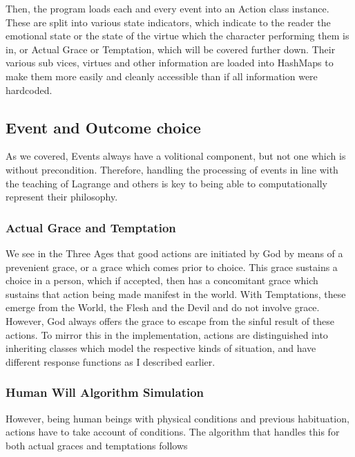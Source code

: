 \documentclass[11pt]{article}
\begin{document}
Then, the program loads each and every event into an Action class instance. These are split into various state indicators, which indicate to the reader the emotional state or the state of the virtue which the character performing them is in, or Actual Grace or Temptation, which will be covered further down. Their various sub vices, virtues and other information are loaded into HashMaps to make them more easily and cleanly accessible than if all information were hardcoded. 

\subsection{Event and Outcome choice}
As we covered, Events always have a volitional component, but not one which is without precondition. Therefore, handling the processing of events in line with the teaching of Lagrange and others is key to being able to computationally represent their philosophy. \\
\subsubsection{Actual Grace and Temptation}
We see in the Three Ages \cite{garrigou2013three} that good actions are initiated by God by means of a prevenient grace, or a grace which comes prior to choice. This grace sustains a choice in a person, which if accepted, then has a concomitant grace which sustains that action being made manifest in the world. With Temptations, these emerge from the World, the Flesh and the Devil and do not involve grace. However, God always offers the grace to escape from the sinful result of these actions. To mirror this in the implementation, actions are distinguished into inheriting classes which model the respective kinds of situation, and have different response functions as I described earlier. \\

\subsubsection{Human Will Algorithm Simulation}
However, being human beings with physical conditions and previous habituation, actions have to take account of conditions. The algorithm that handles this for both actual graces and temptations follows\:
\end{document}
